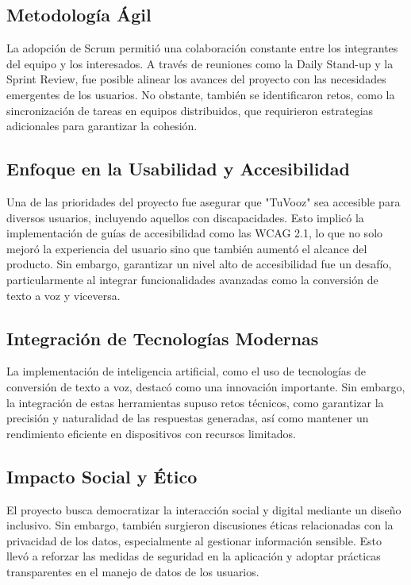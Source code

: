 \documentclass[12pt, a4paper, twocolumn]{article}
\begin{document}
\subsection*{Metodología Ágil}
La adopción de Scrum permitió una colaboración constante entre los integrantes del equipo y los interesados. A través de reuniones como la Daily Stand-up y la Sprint Review, fue posible alinear los avances del proyecto con las necesidades emergentes de los usuarios. No obstante, también se identificaron retos, como la sincronización de tareas en equipos distribuidos, que requirieron estrategias adicionales para garantizar la cohesión.

\subsection*{Enfoque en la Usabilidad y Accesibilidad}
Una de las prioridades del proyecto fue asegurar que "TuVooz" sea accesible para diversos usuarios, incluyendo aquellos con discapacidades. Esto implicó la implementación de guías de accesibilidad como las WCAG 2.1, lo que no solo mejoró la experiencia del usuario sino que también aumentó el alcance del producto. Sin embargo, garantizar un nivel alto de accesibilidad fue un desafío, particularmente al integrar funcionalidades avanzadas como la conversión de texto a voz y viceversa.

\subsection*{Integración de Tecnologías Modernas}
La implementación de inteligencia artificial, como el uso de tecnologías de conversión de texto a voz, destacó como una innovación importante. Sin embargo, la integración de estas herramientas supuso retos técnicos, como garantizar la precisión y naturalidad de las respuestas generadas, así como mantener un rendimiento eficiente en dispositivos con recursos limitados.

\subsection*{Impacto Social y Ético}
El proyecto busca democratizar la interacción social y digital mediante un diseño inclusivo. Sin embargo, también surgieron discusiones éticas relacionadas con la privacidad de los datos, especialmente al gestionar información sensible. Esto llevó a reforzar las medidas de seguridad en la aplicación y adoptar prácticas transparentes en el manejo de datos de los usuarios.
\end{document}
